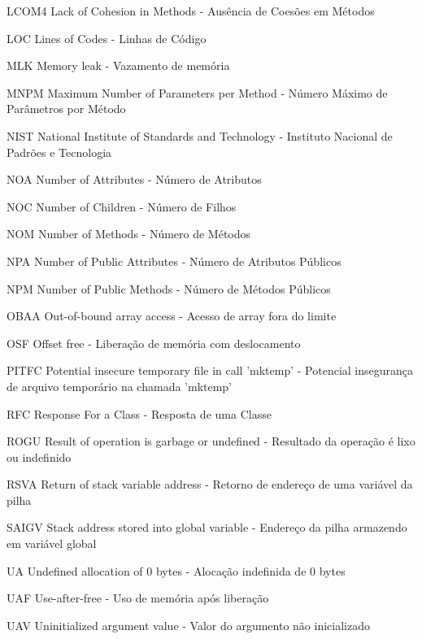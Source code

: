 \begin{siglas}
  \item[LCOM4] Lack of Cohesion in Methods - Ausência de Coesões em Métodos
  \item[LOC] Lines of Codes - Linhas de Código
  \item[MLK] Memory leak - Vazamento de memória
  \item[MNPM] Maximum Number of Parameters per Method - Número Máximo de Parâmetros por Método
  \item[NIST] National Institute of Standards and Technology - Instituto
    Nacional de Padrões e Tecnologia
  \item[NOA] Number of Attributes - Número de Atributos
  \item[NOC] Number of Children - Número de Filhos
  \item[NOM] Number of Methods - Número de Métodos
  \item[NPA] Number of Public Attributes - Número de Atributos Públicos
  \item[NPM] Number of Public Methods - Número de Métodos Públicos
  \item[OBAA] Out-of-bound array access - Acesso de array fora do limite
  \item[OSF] Offset free - Liberação de memória com deslocamento
  \item[PITFC] Potential insecure temporary file in call 'mktemp' - Potencial insegurança de arquivo temporário na chamada 'mktemp'
  \item[RFC] Response For a Class - Resposta de uma Classe
  \item[ROGU] Result of operation is garbage or undefined - Resultado da operação é lixo ou indefinido
  \item[RSVA] Return of stack variable address - Retorno de endereço de uma variável da pilha
  \item[SAIGV] Stack address stored into global variable - Endereço da pilha armazendo em variável global
  \item[UA] Undefined allocation of 0 bytes - Alocação indefinida de 0 bytes
  \item[UAF] Use-after-free - Uso de memória após liberação
  \item[UAV] Uninitialized argument value - Valor do argumento não inicializado
\end{siglas}
